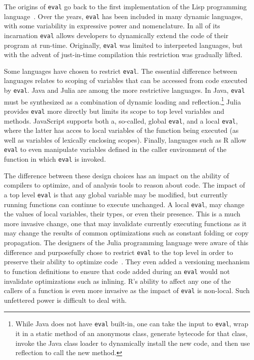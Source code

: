 \documentclass[USenglish,cleveref, autoref, thm-restate]{lipics-v2019}
\newcommand{\eval}{\texttt{eval}\xspace}
\begin{document}
The origins of \eval go back to the first implementation of the Lisp
programming language~\cite{lisp}. Over the years, \eval has been included in
many dynamic languages, with some variability in expressive power and
nomenclature. In all of its incarnation \eval allows developers to
dynamically extend the code of their program at run-time.  Originally, \eval
was limited to interpreted languages, but with the advent of just-in-time
compilation this restriction was gradually lifted.

Some languages have chosen to restrict \eval. The essential difference
between languages relates to scoping of variables that can be accessed from
code executed by \eval.  Java and Julia are among the more restrictive
languages. In Java, \eval must be synthesized as a combination of dynamic
loading and reflection.\footnote{While Java does not have \eval built-in,
  one can take the input to \eval, wrap it in a static method of an
  anonymous class, generate bytecode for that class, invoke the Java class
  loader to dynamically install the new code, and then use reflection to
  call the new method.} Julia provides \eval more directly but limits its
scope to top level variables and methods. JavaScript supports both a,
so-called, global \eval, and a local \eval, where the latter has acces to
local variables of the function being executed (as well as variables of
lexically enclosing scopes). Finally, languages such as R allow \eval to
even manipulate variables defined in the caller environment of the function in
which \eval is invoked.

The difference between these design choices has an impact on the ability of
compilers to optimize, and of analysis tools to reason about code. The
impact of a top level \eval is that any global variable may be modified, but
currently running functions can continue to execute unchanged. A local
\eval, may change the values of local variables, their types, or even their
presence. This is a much more invasive change, one that may invalidate
currently executing functions as it may change the results of common
optimizations such as constant folding or copy propagation. The designers of
the Julia programming language were aware of this difference and
purposefully chose to restrict \eval to the top level in order to preserve
their ability to optimize code~\cite{oopsla18a}. They even added a
versioning mechanism to function definitions to ensure that code added
during an \eval would not invalidate optimizations such as inlining.  R's
ability to affect any one of the callers of a function is even more invasive
as the impact of \eval is non-local. Such unfettered power is difficult to
deal with.
\end{document}
